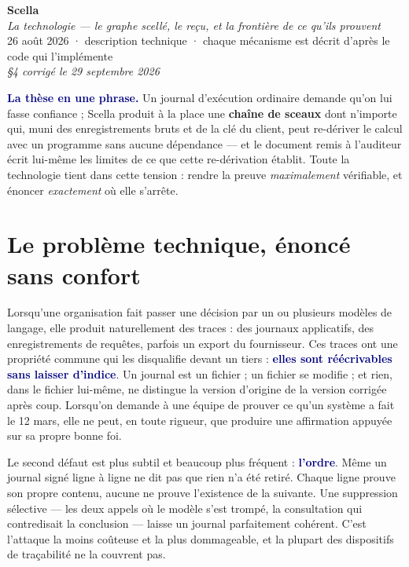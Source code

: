 \documentclass[10pt]{article}
\newcommand{\mm}[1]{\textbf{\textcolor{navy}{#1}}}
\begin{document}
\begin{center}
{\Huge\bfseries\color{navy} Scella}\\[5pt]
{\large\color{grey}\itshape La technologie — le graphe scellé, le reçu, et la frontière de ce qu'ils prouvent}\\[5pt]
{\small\color{grey} 26 août 2026 \; · \; description technique \; · \; chaque mécanisme est décrit d'après le code qui l'implémente}\\[1pt]
{\small\color{grey}\itshape §4 corrigé le 29 septembre 2026}
\end{center}
\vspace{4pt}

\begin{these}
\mm{La thèse en une phrase.} Un journal d'exécution ordinaire demande qu'on lui fasse confiance ; Scella produit à la place une \textbf{chaîne de sceaux} dont n'importe qui, muni des enregistrements bruts et de la clé du client, peut re-dériver le calcul avec un programme sans aucune dépendance — et le document remis à l'auditeur écrit lui-même les limites de ce que cette re-dérivation établit. Toute la technologie tient dans cette tension : rendre la preuve \emph{maximalement} vérifiable, et énoncer \emph{exactement} où elle s'arrête.
\end{these}

\section{Le problème technique, énoncé sans confort}

Lorsqu'une organisation fait passer une décision par un ou plusieurs modèles de langage, elle produit naturellement des traces : des journaux applicatifs, des enregistrements de requêtes, parfois un export du fournisseur. Ces traces ont une propriété commune qui les disqualifie devant un tiers : \mm{elles sont réécrivables sans laisser d'indice}. Un journal est un fichier ; un fichier se modifie ; et rien, dans le fichier lui-même, ne distingue la version d'origine de la version corrigée après coup. Lorsqu'on demande à une équipe de prouver ce qu'un système a fait le 12 mars, elle ne peut, en toute rigueur, que produire une affirmation appuyée sur sa propre bonne foi.

Le second défaut est plus subtil et beaucoup plus fréquent : \mm{l'ordre}. Même un journal signé ligne à ligne ne dit pas que rien n'a été retiré. Chaque ligne prouve son propre contenu, aucune ne prouve l'existence de la suivante. Une suppression sélective — les deux appels où le modèle s'est trompé, la consultation qui contredisait la conclusion — laisse un journal parfaitement cohérent. C'est l'attaque la moins coûteuse et la plus dommageable, et la plupart des dispositifs de traçabilité ne la couvrent pas.
\end{document}
